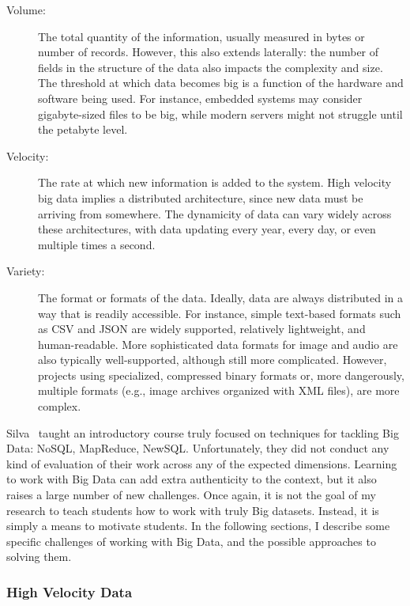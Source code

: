 \begin{description}
	\item[Volume:] The total quantity of the information, usually measured in bytes or number of records. However, this also extends laterally: the number of fields in the structure of the data also impacts the complexity and size. The threshold at which data becomes big is a function of the hardware and software being used. For instance, embedded systems may consider gigabyte-sized files to be big, while modern servers might not struggle until the petabyte level.
	\item[Velocity:] The rate at which new information is added to the system. High velocity big data implies a distributed architecture, since new data must be arriving from somewhere. The dynamicity of data can vary widely across these architectures, with data updating every year, every day, or even multiple times a second.
	\item[Variety:] The format or formats of the data. Ideally, data are always distributed in a way that is readily accessible. For instance, simple text-based formats such as CSV and JSON are widely supported, relatively lightweight, and human-readable. More sophisticated data formats for image and audio are also typically well-supported, although still more complicated. However, projects using specialized, compressed binary formats or, more dangerously, multiple formats (e.g., image archives organized with XML files), are more complex.
\end{description}

Silva~\cite{Silva:2014} taught an introductory course truly focused on techniques for tackling Big Data: NoSQL, MapReduce, NewSQL.
Unfortunately, they did not conduct any kind of evaluation of their work across any of the expected dimensions. 
Learning to work with Big Data can add extra authenticity to the context, but it also raises a large number of new challenges.
Once again, it is not the goal of my research to teach students how to work with truly Big datasets. Instead, it is simply a means to motivate students.
In the following sections, I describe some specific challenges of working with Big Data, and the possible approaches to solving them.

\subsubsection{High Velocity Data}

